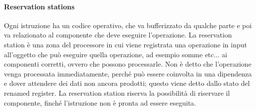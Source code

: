 \documentclass[14pt]{article}
\begin{document}
\paragraph{Reservation stations}
Ogni istruzione ha un codice operativo, che va bufferizzato da qualche parte e poi va relazionato al componente che deve eseguire l'operazione. La reservation station è una zona del processore in cui viene registrata una operazione in input all'oggetto che può eseguire quella operazione, ad esempio somme etc... ai componenti corretti, ovvero che possono processarle. Non è detto che l'operazione venga processata immediatamente, perché può essere coinvolta in una dipendenza e dover attendere dei dati non ancora prodotti; questo viene detto dallo stato del renamed register. La reservation station riserva la possibilità di riservare il componente, finché l'istruzione non è pronta ad essere eseguita.
\end{document}
